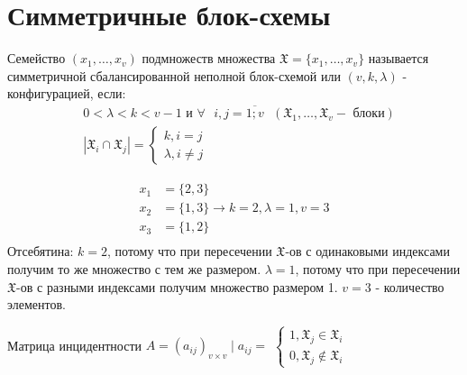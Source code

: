 \section{Симметричные блок-схемы}

\opr Семейство $(x_1, \dots, x_v)$ подмножеств множества $\mathfrak{X} = \lbrace x_1, \dots, x_v\rbrace$
называется симметричной сбалансированной неполной блок-схемой или $(v, k , \lambda)$ - конфигурацией, если:
\begin{align*}
	&0 < \lambda < k < v - 1 \text{ и } \forall \text{ } i, j  = \overline{1;v} \text{ } (\mathfrak{X}_1, \dots, \mathfrak{X}_v - \text{ блоки})\\
	&|\mathfrak{X}_i \cap \mathfrak{X}_j| = 
	\begin{cases}
		k, i = j \\
		\lambda, i \neq j
	\end{cases}
\end{align*}

\examplei

\begin{align*}
	x_1 &= \lbrace 2, 3 \rbrace \\
	x_2 &= \lbrace 1, 3 \rbrace \rightarrow k = 2, \lambda = 1, v = 3\\
	x_3 &= \lbrace 1, 2 \rbrace \\
\end{align*}
Отсебятина: $k = 2$, потому что при пересечении $\mathfrak{X}$-ов с одинаковыми индексами получим то же множество с тем же размером.
$\lambda = 1$, потому что при пересечении $\mathfrak{X}$-ов с разными индексами получим множество размером 1.
$v = 3$ - количество элементов.

Матрица инцидентности $A = (a_{ij})_{v \times v} \mid a_{ij} = $
$\begin{cases}
	1, \mathfrak{X}_j \in \mathfrak{X}_i \\
	0, \mathfrak{X}_j \notin \mathfrak{X}_i
\end{cases}$

